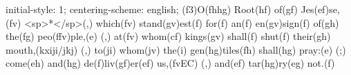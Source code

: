 initial-style: 1;
centering-scheme: english;
(f3)O(fhhg) Root(hf) of(gf) Jes(ef)se,(fv) <sp>*</sp>(,) which(fv) stand(gv)est(f) for(f) an(f) en(gv)sign(f) of(gh) the(fg) peo(ffv)ple,(e) (,) at(fv) whom(cf) kings(gv) shall(f) shut(f) their(gh) mouth,(kxiji/jkj) (,) to(ji) whom(jv) the(i) gen(hg)tiles(fh) shall(hg) pray:(e) (;) come(eh) and(hg) de(f)liv(gf)er(ef) us,(fvEC) (,) and(ef) tar(hg)ry(eg) not.(f)
